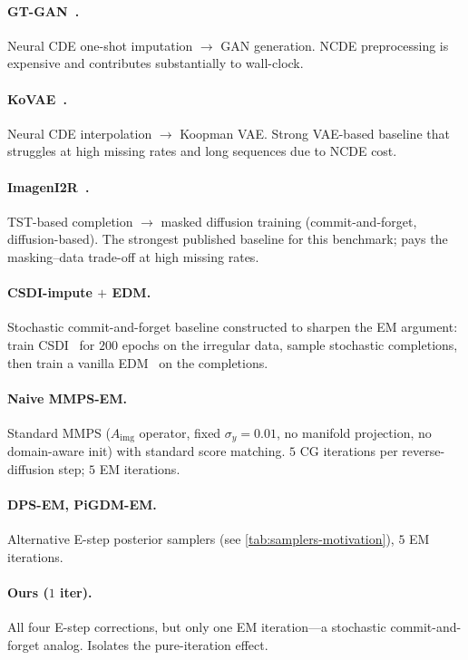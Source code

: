 \documentclass{article}
\theoremstyle{plain}
\theoremstyle{definition}
\theoremstyle{remark}
\newcommand{\Aimg}{A_{\mathrm{img}}}
\begin{document}
\paragraph{GT-GAN~\citep{jeon2022gtgan}.}
Neural CDE one-shot imputation $\to$ GAN generation. NCDE preprocessing is expensive and contributes substantially to wall-clock.

\paragraph{KoVAE~\citep{naiman2024kovae}.}
Neural CDE interpolation $\to$ Koopman VAE. Strong VAE-based baseline that struggles at high missing rates and long sequences due to NCDE cost.

\paragraph{ImagenI2R~\citep{fadlon2025imageni2r}.}
TST-based completion $\to$ masked diffusion training (commit-and-forget, diffusion-based). The strongest published baseline for this benchmark; pays the masking--data trade-off at high missing rates.

\paragraph{CSDI-impute $+$ EDM.}
Stochastic commit-and-forget baseline constructed to sharpen the EM argument: train CSDI~\citep{tashiro2021csdi} for $200$ epochs on the irregular data, sample stochastic completions, then train a vanilla EDM~\citep{karras2022edm} on the completions.

\paragraph{Naive MMPS-EM.}
Standard MMPS ($\Aimg$ operator, fixed $\sigma_y = 0.01$, no manifold projection, no domain-aware init) with standard score matching. $5$ CG iterations per reverse-diffusion step; $5$ EM iterations.

\paragraph{DPS-EM, PiGDM-EM.}
Alternative E-step posterior samplers (see \cref{tab:samplers-motivation}), $5$ EM iterations.

\paragraph{Ours ($1$ iter).}
All four E-step corrections, but only one EM iteration---a stochastic commit-and-forget analog. Isolates the pure-iteration effect.
\end{document}

